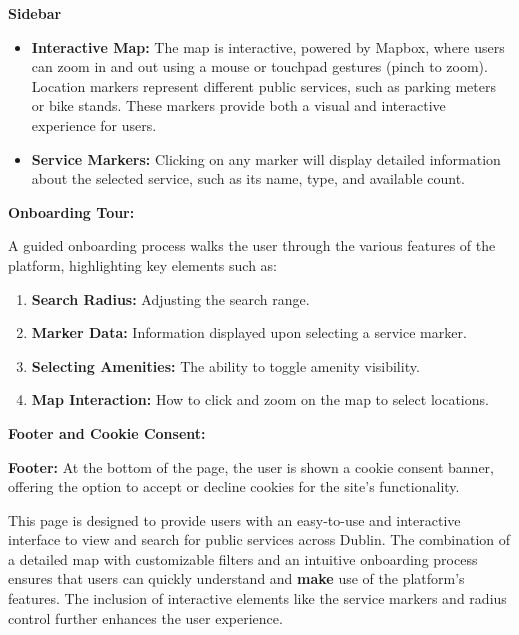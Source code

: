 \textbf{Sidebar}

\begin{itemize}
    \item{} \textbf{Interactive Map:} The map is interactive, powered by Mapbox, where users can zoom in and out using a mouse or touchpad gestures (pinch to zoom). Location markers represent different public services, such as parking meters or bike stands. These markers provide both a visual and interactive experience for users.
    \item{} \textbf{Service Markers:} Clicking on any marker will display detailed information about the selected service, such as its name, type, and available count.
\end{itemize}

\textbf{Onboarding Tour:}

A guided onboarding process walks the user through the various features of the platform, highlighting key elements such as:

\begin{enumerate}
    \item{} \textbf{Search Radius:} Adjusting the search range.
    \item{} \textbf{Marker Data:} Information displayed upon selecting a service marker.
    \item{} \textbf{Selecting Amenities:} The ability to toggle amenity visibility.
    \item{} \textbf{Map Interaction:} How  to click and zoom on the map to select locations.
\end{enumerate}

\textbf{Footer and Cookie Consent:}

\textbf{Footer:} At the bottom of the page, the user is shown a cookie consent banner, offering the option to accept or decline cookies for the site’s functionality.

This page is designed to provide users with an easy{-}to{-}use and interactive interface to view and search for public services across Dublin. The combination of a detailed map with customizable filters and an intuitive onboarding process ensures that users can quickly understand and \textbf{make} use of the platform’s features. The inclusion of interactive elements like the service markers and radius control further enhances the user experience.


\paragraph{}